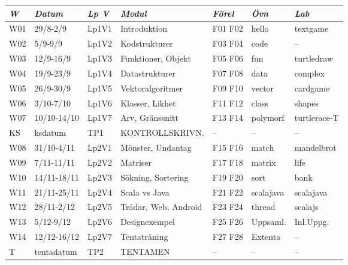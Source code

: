 \begin{tabular}{l|l|l|l|l|l|l}
\textit{W} & \textit{Datum} & \textit{Lp V} & \textit{Modul} & \textit{Förel} & \textit{Övn} & \textit{Lab} \\ \hline \hline
W01 & 29/8-2/9    & Lp1V1 & Introduktion         & F01 F02 & hello     & textgame     \\
W02 & 5/9-9/9     & Lp1V2 & Kodstrukturer        & F03 F04 & code      & --           \\
W03 & 12/9-16/9   & Lp1V3 & Funktioner, Objekt   & F05 F06 & fun       & turtledraw   \\
W04 & 19/9-23/9   & Lp1V4 & Datastrukturer       & F07 F08 & data      & complex      \\
W05 & 26/9-30/9   & Lp1V5 & Vektoralgoritmer     & F09 F10 & vector    & cardgame     \\
W06 & 3/10-7/10   & Lp1V6 & Klasser, Likhet      & F11 F12 & class     & shapes       \\
W07 & 10/10-14/10 & Lp1V7 & Arv, Gränssnitt      & F13 F14 & polymorf  & turtlerace-T \\
KS  & ksdatum     & TP1   & KONTROLLSKRIVN.      & --      & --        & --           \\
W08 & 31/10-4/11  & Lp2V1 & Mönster, Undantag    & F15 F16 & match     & mandelbrot   \\
W09 & 7/11-11/11  & Lp2V2 & Matriser             & F17 F18 & matrix    & life         \\
W10 & 14/11-18/11 & Lp2V3 & Sökning, Sortering   & F19 F20 & sort      & bank         \\
W11 & 21/11-25/11 & Lp2V4 & Scala vs Java        & F21 F22 & scalajava & scalajava    \\
W12 & 28/11-2/12  & Lp2V5 & Trådar, Web, Android & F23 F24 & thread    & scalajs      \\
W13 & 5/12-9/12   & Lp2V6 & Designexempel        & F25 F26 & Uppsaml.  & Inl.Uppg.    \\
W14 & 12/12-16/12 & Lp2V7 & Tentaträning         & F27 F28 & Extenta   & --           \\
T   & tentadatum  & TP2   & TENTAMEN             & --      & --        & --           \\
\end{tabular}
